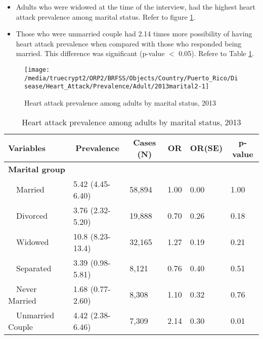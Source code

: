  \newpage
\begin{itemize}

\item Adults who were 
widowed at the time of the interview, had the highest heart attack prevalence among marital status. Refer to figure \ref{fig:marital.Heart_Attack.2013}.

\item Those who were unmarried couple had 2.14 times more possibility of having heart attack prevalence when compared with those who responded being married. This difference was significant (p-value $<$ 0.05). Refere to Table \ref{tab:marital.Heart_Attack.2013}.

\end{itemize}

\begin{figure}[H]
\caption{Heart attack prevalence among adults by marital status,
         2013}
\label{fig:marital.Heart_Attack.2013}
\begin{knitrout}
\color{fgcolor}

{\centering \texttt{[image: /media/truecrypt2/ORP2/BRFSS/Objects/Country/Puerto\_Rico/Disease/Heart\_Attack/Prevalence/Adult/2013marital2-1]} 

}



\end{knitrout}
 \end{figure}

\begin{table}[H]
\caption{Heart attack prevalence  among adults by marital status, 2013\label{tab:marital.Heart_Attack.2013}} 
\begin{center}
\begin{tabular}{llllll}
\hline\hline
\multicolumn{1}{l}{Variables}&\multicolumn{1}{c}{Prevalence}&\multicolumn{1}{c}{Cases (N)}&\multicolumn{1}{c}{OR}&\multicolumn{1}{c}{OR(SE)}&\multicolumn{1}{c}{p-value}\tabularnewline
\hline
{\bfseries Marital group}&&&&&\tabularnewline
~~Married&5.42 (4.45-6.40)&58,894&1.00&0.00&1.00\tabularnewline
~~Divorced&3.76 (2.32-5.20)&19,888&0.70&0.26&0.18\tabularnewline
~~Widowed&10.8 (8.23-13.4)&32,165&1.27&0.19&0.21\tabularnewline
~~Separated&3.39 (0.98-5.81)& 8,121&0.76&0.40&0.51\tabularnewline
~~Never Married&1.68 (0.77-2.60)& 8,308&1.10&0.32&0.76\tabularnewline
~~Unmarried Couple&4.42 (2.38-6.46)& 7,309&2.14&0.30&0.01\tabularnewline
\hline
\end{tabular}\end{center}

\end{table}


